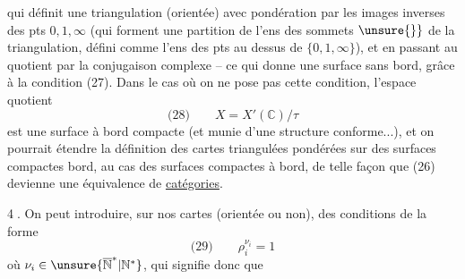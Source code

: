 qui définit une triangulation (orientée) avec pondération par les images inverses des pts $0,1,\infty$ (qui forment  une partition de l'ens des sommets $\unsure{\}}$ de la triangulation, défini comme l'ens des pts au dessus de $\{0,1,\infty\}$), et en passant au quotient par la conjugaison complexe -- ce qui donne une surface sans bord, grâce à la condition (27). Dans le cas où on ne pose pas cette condition, l'espace quotient
\[
\text{(28)}\qquad X=X'(\mathbb C)/\tau
\]
est une surface à bord compacte (et munie d'une structure conforme...), et on pourrait étendre  la définition des cartes  triangulées pondérées sur des surfaces compactes  bord, au cas des surfaces compactes à bord, de telle façon que (26) devienne une équivalence de \uline{catégories}.

\textcircled{4.} On peut introduire, sur nos cartes (orientée ou non), des conditions de la forme
\[
\text{(29)}\qquad \rho_i^{\nu_i}=1
\]
 où $\nu_i\in\unsure{\overline{\mathbb N}^{*}|\mathbb N^{*}}$, qui signifie donc que
